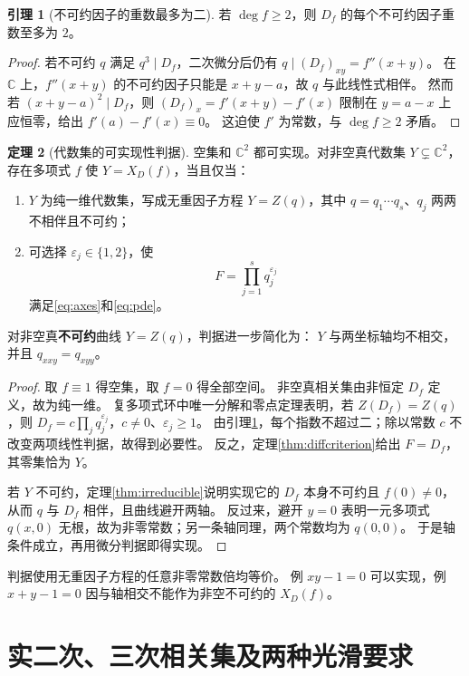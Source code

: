 \documentclass[UTF8,11pt,a4paper]{ctexart}
\theoremstyle{definition}
\newtheorem{theorem}{定理}[section]
\newtheorem{lemma}[theorem]{引理}
\newcommand{\C}{\mathbb C}
\begin{document}
\begin{lemma}[不可约因子的重数最多为二]\label{lem:multiplicity}
若 $\deg f\ge2$，则 $D_f$ 的每个不可约因子重数至多为 $2$。
\end{lemma}
\begin{proof}
若不可约 $q$ 满足 $q^3\mid D_f$，二次微分后仍有 $q\mid(D_f)_{xy}=f''(x+y)$。
在 $\C$ 上，$f''(x+y)$ 的不可约因子只能是 $x+y-a$，故 $q$ 与此线性式相伴。
然而若 $(x+y-a)^2\mid D_f$，则 $(D_f)_x=f'(x+y)-f'(x)$ 限制在 $y=a-x$ 上应恒零，给出 $f'(a)-f'(x)\equiv0$。
这迫使 $f'$ 为常数，与 $\deg f\ge2$ 矛盾。
\end{proof}

\begin{theorem}[代数集的可实现性判据]\label{thm:realization}
空集和 $\C^2$ 都可实现。对非空真代数集 $Y\subsetneq\C^2$，存在多项式 $f$ 使 $Y=X_D(f)$，当且仅当：
\begin{enumerate}
\item $Y$ 为纯一维代数集，写成无重因子方程 $Y=Z(q)$，其中 $q=q_1\cdots q_s$、$q_j$ 两两不相伴且不可约；
\item 可选择 $\varepsilon_j\in\{1,2\}$，使
\[
 F=\prod_{j=1}^s q_j^{\varepsilon_j}
\]
满足\eqref{eq:axes}和\eqref{eq:pde}。
\end{enumerate}
对非空真\textbf{不可约}曲线 $Y=Z(q)$，判据进一步简化为：
$Y$ 与两坐标轴均不相交，并且 $q_{xxy}=q_{xyy}$。
\end{theorem}
\begin{proof}
取 $f\equiv1$ 得空集，取 $f=0$ 得全部空间。
非空真相关集由非恒定 $D_f$ 定义，故为纯一维。
复多项式环中唯一分解和零点定理表明，若 $Z(D_f)=Z(q)$，则
$D_f=c\prod_jq_j^{\varepsilon_j}$，$c\ne0$、$\varepsilon_j\ge1$。
由引理\ref{lem:multiplicity}，每个指数不超过二；除以常数 $c$ 不改变两项线性判据，故得到必要性。
反之，定理\ref{thm:diffcriterion}给出 $F=D_f$，其零集恰为 $Y$。

若 $Y$ 不可约，定理\ref{thm:irreducible}说明实现它的 $D_f$ 本身不可约且 $f(0)\ne0$，从而 $q$ 与 $D_f$ 相伴，且曲线避开两轴。
反过来，避开 $y=0$ 表明一元多项式 $q(x,0)$ 无根，故为非零常数；另一条轴同理，两个常数均为 $q(0,0)$。
于是轴条件成立，再用微分判据即得实现。
\end{proof}
判据使用无重因子方程的任意非零常数倍均等价。
例 $xy-1=0$ 可以实现，例 $x+y-1=0$ 因与轴相交不能作为非空不可约的 $X_D(f)$。

\section{实二次、三次相关集及两种光滑要求}\label{sec:real}
\end{document}

